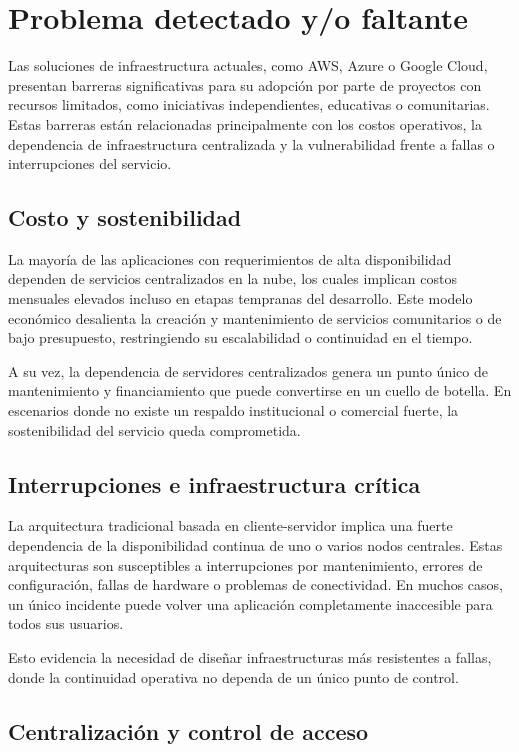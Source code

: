 \section{Problema detectado y/o faltante}

Las soluciones de infraestructura actuales, como AWS, Azure o Google Cloud, presentan barreras significativas para su adopción por parte de proyectos con recursos limitados, como iniciativas independientes, educativas o comunitarias. Estas barreras están relacionadas principalmente con los costos operativos, la dependencia de infraestructura centralizada y la vulnerabilidad frente a fallas o interrupciones del servicio.

\subsection{Costo y sostenibilidad}

La mayoría de las aplicaciones con requerimientos de alta disponibilidad dependen de servicios centralizados en la nube, los cuales implican costos mensuales elevados incluso en etapas tempranas del desarrollo. Este modelo económico desalienta la creación y mantenimiento de servicios comunitarios o de bajo presupuesto, restringiendo su escalabilidad o continuidad en el tiempo.

A su vez, la dependencia de servidores centralizados genera un punto único de mantenimiento y financiamiento que puede convertirse en un cuello de botella. En escenarios donde no existe un respaldo institucional o comercial fuerte, la sostenibilidad del servicio queda comprometida.

\subsection{Interrupciones e infraestructura crítica}

La arquitectura tradicional basada en cliente-servidor implica una fuerte dependencia de la disponibilidad continua de uno o varios nodos centrales. Estas arquitecturas son susceptibles a interrupciones por mantenimiento, errores de configuración, fallas de hardware o problemas de conectividad. En muchos casos, un único incidente puede volver una aplicación completamente inaccesible para todos sus usuarios.

Esto evidencia la necesidad de diseñar infraestructuras más resistentes a fallas, donde la continuidad operativa no dependa de un único punto de control.

\subsection{Centralización y control de acceso}

